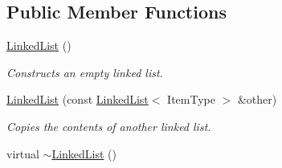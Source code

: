 \subsection*{Public Member Functions}
\begin{DoxyCompactItemize}
\item 
\hypertarget{class_linked_list_adf8d8164e06b6d358a36df7e53e814ee}{\hyperlink{class_linked_list_adf8d8164e06b6d358a36df7e53e814ee}{Linked\-List} ()}\label{class_linked_list_adf8d8164e06b6d358a36df7e53e814ee}

\begin{DoxyCompactList}\small\item\em Constructs an empty linked list. \end{DoxyCompactList}\item 
\hyperlink{class_linked_list_a348f750d6770905429ca9c5068301baf}{Linked\-List} (const \hyperlink{class_linked_list}{Linked\-List}$<$ Item\-Type $>$ \&other)
\begin{DoxyCompactList}\small\item\em Copies the contents of another linked list. \end{DoxyCompactList}\item 
\hypertarget{class_linked_list_a66aee17d756fe0e002375897383c180b}{virtual \hyperlink{class_linked_list_a66aee17d756fe0e002375897383c180b}{$\sim$\-Linked\-List} ()}\label{class_linked_list_a66aee17d756fe0e002375897383c180b}


\end{DoxyCompactItemize}
